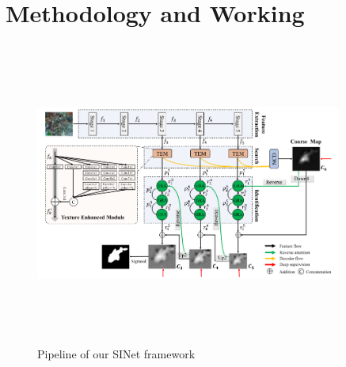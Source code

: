 \section{{{\fontsize{17}{21}\selectfont \textbf{Methodology and Working}}}}
\setlength{\columnsep}{1.5cm}
\vspace{0.5cm}
\begin{figure}[h]
  \centering
  \includegraphics[width=0.9\textwidth,height=10cm]{sections/LBP/sinet.png}
  \caption{Pipeline of our SINet framework}
  \label{fig:figure_label}
\end{figure}


